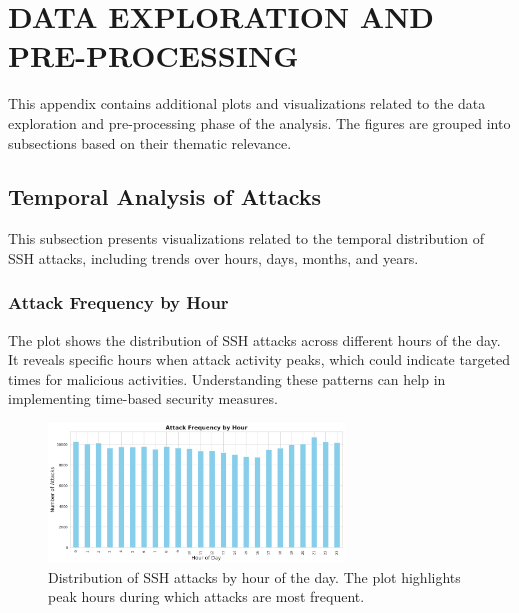 
\vspace{-1.25cm}

\section{DATA EXPLORATION AND PRE-PROCESSING}


    This appendix contains additional plots and visualizations related to the data exploration and pre-processing phase of the analysis. The figures are grouped into subsections based on their thematic relevance.

    \subsection{Temporal Analysis of Attacks}

        This subsection presents visualizations related to the temporal distribution of SSH attacks, including trends over hours, days, months, and years.

        \subsubsection{Attack Frequency by Hour \\}
        
            The plot shows the distribution of SSH attacks across different hours of the day. It reveals specific hours when attack activity peaks, which could indicate targeted times for malicious activities. Understanding these patterns can help in implementing time-based security measures.

            \begin{figure}[H]
                \centering
                \includegraphics[width=0.7\textwidth]{../figures/plots/section1/attack_frequency_by_hour.png}
                \caption{Distribution of SSH attacks by hour of the day. The plot highlights peak hours during which attacks are most frequent.}
                \label{fig:attack_frequency_by_hour}
            \end{figure}

